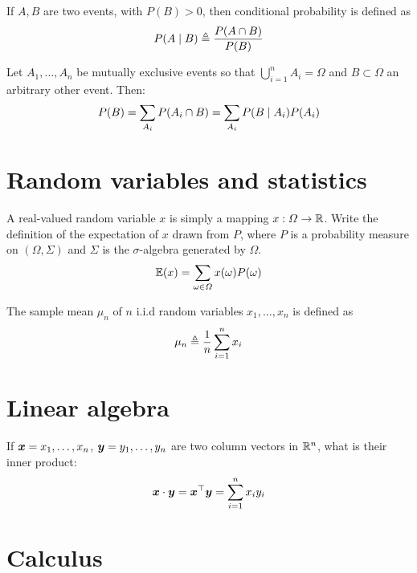 \documentclass[a4paper]{article}
\def\solution {1}
\begin{document}
\begin{exercise}
  If $A, B$ are two events, with $P(B) > 0$, then conditional probability is defined as
  \[
  P(A \mid B) \defn 
  \ifdefined \solution
  \frac{P(A \cap B)}{P(B)}
  \else
  \ldots
  \fi
  \]
\end{exercise}

\begin{exercise}
  Let $A_1, \ldots, A_n$ be mutually exclusive events so that $\bigcup_{i=1}^n A_i = \Omega$ and $B \subset \Omega$ an arbitrary other event. Then:
  \[
  P(B) = \sum_{A_i} 
  \ifdefined \solution
  P(A_i \cap B)
  =
  \sum_{A_i} 
  P(B \mid A_i)
  P(A_i )
  \else
  \ldots
  \fi
  \]
\end{exercise}

\section{Random variables and statistics}


\begin{exercise}
  A real-valued random variable $x$ is simply a mapping $x : \Omega \to {\mathbb{R}}$.
  Write the definition of the expectation of $x$ drawn from $P$, where $P$ is a probability measure on $(\Omega, \Sigma)$ and $\Sigma$ is the $\sigma$-algebra generated by $\Omega$.
  \[
  \E(x) = 
  \ifdefined \solution
  \sum_{\omega \in \Omega} x(\omega) P(\omega) 
  \else
  \ldots
  \fi
  \]
\end{exercise}

\begin{exercise}
  The sample mean $\mu_n$ of $n$  i.i.d random variables $x_1, \ldots, x_n$ is defined as
  \[
  \mu_n \defn
  \ifdefined \solution
  \frac{1}{n} \sum_{i=1}^n x_i
  \else
  \ldots 
  \fi
  \]
\end{exercise}


\section{Linear algebra}

\begin{exercise}
  If $\bx = x_1, \ldots, x_n$, $\by = y_1, \ldots, y_n$ are two column vectors in ${\mathbb{R}}^n$, what is their inner product:
  \[
  \bx \cdot \by = \bx^\top \by = 
  \ifdefined \solution
  \sum_{i=1}^n x_i y_i
  \fi
  \]
\end{exercise}


\section{Calculus}
\end{document}
